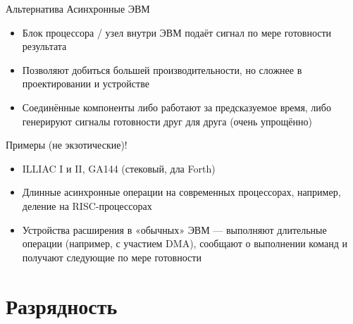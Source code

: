 \documentclass[xetex,aspectratio=43]{beamer}
\begin{document}
\begin{frame}{Альтернатива}
    Асинхронные ЭВМ

    \begin{itemize}
        \tightlist
        \item
        Блок процессора / узел внутри ЭВМ подаёт сигнал по мере готовности
        результата
        \item
        Позволяют добиться большей производительности, но сложнее в
        проектировании и устройстве
        \item
        Соединённые компоненты либо работают за предсказуемое время, либо генерируют сигналы готовности друг для друга (очень упрощённо)
    \end{itemize}

    Примеры (не экзотические)!

    \begin{itemize}
        \tightlist
        \item
        ILLIAC I и II, GA144 (стековый, дла Forth)
        \item
        Длинные асинхронные операции на современных процессорах, например,
        деление на RISC-процессорах
    \end{itemize}

    \pause

    \begin{itemize}
        \item
        Устройства расширения в «обычных» ЭВМ --- выполняют длительные
        операции (например, с участием DMA), сообщают о выполнении команд и
        получают следующие по мере готовности
    \end{itemize}
\end{frame}

\section{Разрядность}
\end{document}
